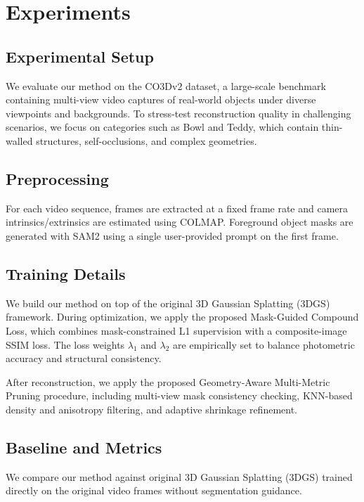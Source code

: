\section{Experiments}

\subsection{Experimental Setup}

We evaluate our method on the CO3Dv2 dataset, a large-scale benchmark containing multi-view video captures of real-world objects under diverse viewpoints and backgrounds. To stress-test reconstruction quality in challenging scenarios, we focus on categories such as Bowl and Teddy, which contain thin-walled structures, self-occlusions, and complex geometries.

\subsection{Preprocessing}

For each video sequence, frames are extracted at a fixed frame rate and camera intrinsics/extrinsics are estimated using COLMAP. Foreground object masks are generated with SAM2 using a single user-provided prompt on the first frame.

\subsection{Training Details}

We build our method on top of the original 3D Gaussian Splatting (3DGS) framework. During optimization, we apply the proposed Mask-Guided Compound Loss, which combines mask-constrained L1 supervision with a composite-image SSIM loss. The loss weights $\lambda_1$ and $\lambda_2$ are empirically set to balance photometric accuracy and structural consistency.

After reconstruction, we apply the proposed Geometry-Aware Multi-Metric Pruning procedure, including multi-view mask consistency checking, KNN-based density and anisotropy filtering, and adaptive shrinkage refinement.

\subsection{Baseline and Metrics}

We compare our method against original 3D Gaussian Splatting (3DGS) trained directly on the original video frames without segmentation guidance.

